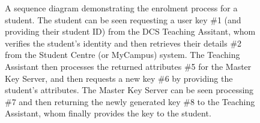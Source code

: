 \begin{appendices}
\begin{figure}
    \caption{A sequence diagram demonstrating the enrolment process for a student. The student can be seen requesting a user key \#1 (and providing their student ID) from the DCS Teaching Assitant, whom verifies the student's identity and then retrieves their details \#2 from the Student Centre (or MyCampus) system. The Teaching Assistant then processes the returned attributes \#5 for the Master Key Server, and then requests a new key \#6 by providing the student's attributes. The Master Key Server can be seen processing \#7 and then returning the newly generated key \#8 to the Teaching Assistant, whom finally provides the key to the student.}
    
\end{figure}

\end{appendices}
